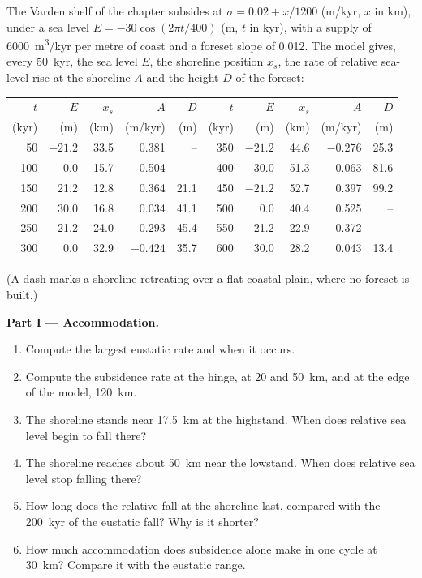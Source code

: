\begin{problem}
\label{pb:b3:sequence-stratigraphy:1}
The Varden shelf of the chapter subsides at $\sigma = 0.02 + x/1200$
(\unit{m/kyr}, $x$ in km), under a sea level $E = -30\cos(2\pi t/400)$ (m,
$t$ in kyr), with a supply of \qty{6000}{m^3/kyr} per metre of coast and a
foreset slope of 0.012. The model gives, every \qty{50}{kyr}, the sea level
$E$, the shoreline position $x_s$, the rate of relative sea-level rise at the
shoreline $A$ and the height $D$ of the foreset:

\begin{center}\small
\begin{tabular}{rrrrr|rrrrr}
$t$ & $E$ & $x_s$ & $A$ & $D$ & $t$ & $E$ & $x_s$ & $A$ & $D$\\
(kyr) & (m) & (km) & (m/kyr) & (m) & (kyr) & (m) & (km) & (m/kyr) & (m)\\\hline
50 & $-21.2$ & 33.5 & 0.381 & -- & 350 & $-21.2$ & 44.6 & $-0.276$ & 25.3\\
100 & 0.0 & 15.7 & 0.504 & -- & 400 & $-30.0$ & 51.3 & 0.063 & 81.6\\
150 & 21.2 & 12.8 & 0.364 & 21.1 & 450 & $-21.2$ & 52.7 & 0.397 & 99.2\\
200 & 30.0 & 16.8 & 0.034 & 41.1 & 500 & 0.0 & 40.4 & 0.525 & --\\
250 & 21.2 & 24.0 & $-0.293$ & 45.4 & 550 & 21.2 & 22.9 & 0.372 & --\\
300 & 0.0 & 32.9 & $-0.424$ & 35.7 & 600 & 30.0 & 28.2 & 0.043 & 13.4\\
\end{tabular}
\end{center}
(A dash marks a shoreline retreating over a flat coastal plain, where no
foreset is built.)

\medskip\noindent\textbf{Part I --- Accommodation.}
\begin{enumerate}
\item Compute the largest eustatic rate and when it occurs.
\item Compute the subsidence rate at the hinge, at 20 and \qty{50}{km}, and
  at the edge of the model, \qty{120}{km}.
\item The shoreline stands near \qty{17.5}{km} at the highstand. When does
  relative sea level begin to fall there?
\item The shoreline reaches about \qty{50}{km} near the lowstand. When does
  relative sea level stop falling there?
\item How long does the relative fall at the shoreline last, compared with
  the \qty{200}{kyr} of the eustatic fall? Why is it shorter?
\item How much accommodation does subsidence alone make in one cycle at
  \qty{30}{km}? Compare it with the eustatic range.
\end{enumerate}


\end{problem}
